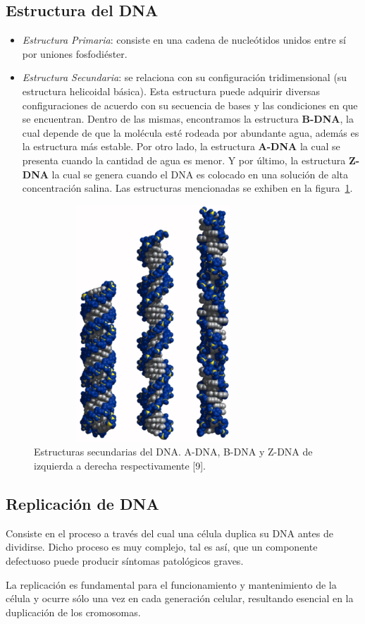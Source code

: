 \subsection{Estructura del DNA}
\begin{itemize}
	\item \emph{Estructura Primaria}: consiste en una cadena de nucleótidos unidos entre sí por uniones fosfodiéster. 
	\item \emph{Estructura Secundaria}: se relaciona con su configuración tridimensional (su 		
				estructura helicoidal básica). Esta estructura puede adquirir diversas configuraciones de acuerdo con su secuencia de bases y las condiciones en que
				se encuentran.
				Dentro de las mismas, encontramos la estructura \textbf{B-DNA}, la cual depende de que la molécula esté rodeada por abundante agua, además es la estructura más estable. Por otro lado, la estructura \textbf{A-DNA} la cual se presenta cuando la cantidad de agua es menor. Y por último, la estructura \textbf{Z-DNA} la cual se genera cuando
				el DNA es colocado en una solución de alta concentración salina. Las estructuras mencionadas se exhiben en la figura~\ref{estrucDNA}.
\end{itemize}

\begin{figure} [h]
  		\hspace*{2cm}\includegraphics[width=3.5209in,height=3.5000in]{image/estructuraSecDNA.png}
   		\caption{Estructuras secundarias del DNA. A-DNA, B-DNA y Z-DNA de izquierda a derecha respectivamente [9].}
   		\label{estrucDNA}
\end{figure}	

\subsection{Replicación de DNA}
\par Consiste en el proceso a través del cual una célula duplica su DNA antes de dividirse. Dicho proceso es muy complejo, tal es así, que un componente defectuoso puede producir síntomas patológicos graves. 
\par La replicación es fundamental para el funcionamiento y mantenimiento de la célula y ocurre sólo una vez en cada generación celular, resultando esencial en la duplicación de los cromosomas.


